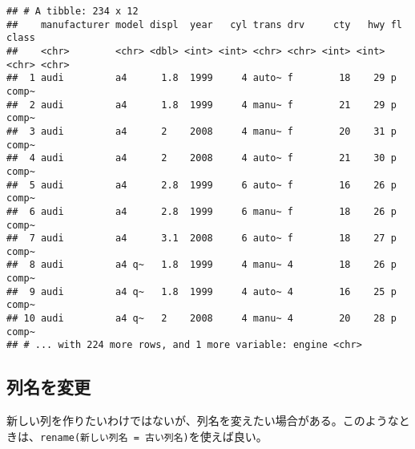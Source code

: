 \documentclass[]{book}
\newenvironment{Shaded}{\begin{snugshade}}{\end{snugshade}}
\newcommand{\KeywordTok}[1]{\textcolor[rgb]{0.13,0.29,0.53}{\textbf{#1}}}
\newcommand{\DataTypeTok}[1]{\textcolor[rgb]{0.13,0.29,0.53}{#1}}
\newcommand{\DecValTok}[1]{\textcolor[rgb]{0.00,0.00,0.81}{#1}}
\newcommand{\StringTok}[1]{\textcolor[rgb]{0.31,0.60,0.02}{#1}}
\newcommand{\CommentTok}[1]{\textcolor[rgb]{0.56,0.35,0.01}{\textit{#1}}}
\newcommand{\OperatorTok}[1]{\textcolor[rgb]{0.81,0.36,0.00}{\textbf{#1}}}
\newcommand{\NormalTok}[1]{#1}
\begin{document}
\begin{Shaded}
\end{Shaded}

\begin{verbatim}
## # A tibble: 234 x 12
##    manufacturer model displ  year   cyl trans drv     cty   hwy fl    class
##    <chr>        <chr> <dbl> <int> <int> <chr> <chr> <int> <int> <chr> <chr>
##  1 audi         a4      1.8  1999     4 auto~ f        18    29 p     comp~
##  2 audi         a4      1.8  1999     4 manu~ f        21    29 p     comp~
##  3 audi         a4      2    2008     4 manu~ f        20    31 p     comp~
##  4 audi         a4      2    2008     4 auto~ f        21    30 p     comp~
##  5 audi         a4      2.8  1999     6 auto~ f        16    26 p     comp~
##  6 audi         a4      2.8  1999     6 manu~ f        18    26 p     comp~
##  7 audi         a4      3.1  2008     6 auto~ f        18    27 p     comp~
##  8 audi         a4 q~   1.8  1999     4 manu~ 4        18    26 p     comp~
##  9 audi         a4 q~   1.8  1999     4 auto~ 4        16    25 p     comp~
## 10 audi         a4 q~   2    2008     4 manu~ 4        20    28 p     comp~
## # ... with 224 more rows, and 1 more variable: engine <chr>
\end{verbatim}

\subsection{列名を変更}

新しい列を作りたいわけではないが、列名を変えたい場合がある。このようなときは、\texttt{rename(新しい列名\ =\ 古い列名)}を使えば良い。

\begin{Shaded}
\end{Shaded}
\end{document}
